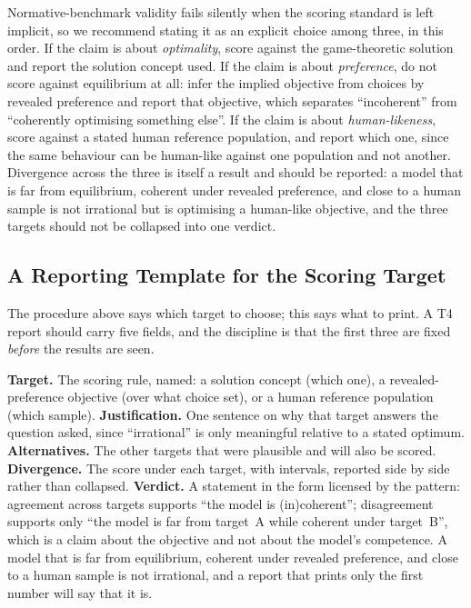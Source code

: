 \documentclass[11pt]{article}
\begin{document}
Normative-benchmark
validity fails silently when the scoring standard is left implicit, so we recommend
stating it as an explicit choice among three, in this order. If the claim is
about \emph{optimality}, score against the game-theoretic solution and report
the solution concept used. If the claim is about \emph{preference}, do not score
against equilibrium at all: infer the implied objective from choices by revealed
preference and report that objective, which separates ``incoherent'' from
``coherently optimising something else''. If the claim is about
\emph{human-likeness}, score against a stated human reference population, and
report which one, since the same behaviour can be human-like against one
population and not another. Divergence across the three is itself a result and
should be reported: a model that is far from equilibrium, coherent under
revealed preference, and close to a human sample is not irrational but is
optimising a human-like objective, and the three targets should not be
collapsed into one verdict.

\subsection{A Reporting Template for the Scoring Target}
\label{app:t4template}

The procedure above says which target to choose; this says what to print. A T4
report should carry five fields, and the discipline is that the first three are
fixed \emph{before} the results are seen.

\textbf{Target.} The scoring rule, named: a solution concept (which one),
a revealed-preference objective (over what choice set), or a human reference
population (which sample). \textbf{Justification.} One sentence on why that
target answers the question asked, since ``irrational'' is only meaningful
relative to a stated optimum. \textbf{Alternatives.} The other targets that were
plausible and will also be scored. \textbf{Divergence.} The score under each
target, with intervals, reported side by side rather than collapsed.
\textbf{Verdict.} A statement in the form licensed by the pattern: agreement
across targets supports ``the model is (in)coherent''; disagreement supports
only ``the model is far from target~A while coherent under target~B'', which is
a claim about the objective and not about the model's competence. A model that
is far from equilibrium, coherent under revealed preference, and close to a human
sample is not irrational, and a report that prints only the first number will say
that it is.
\end{document}
